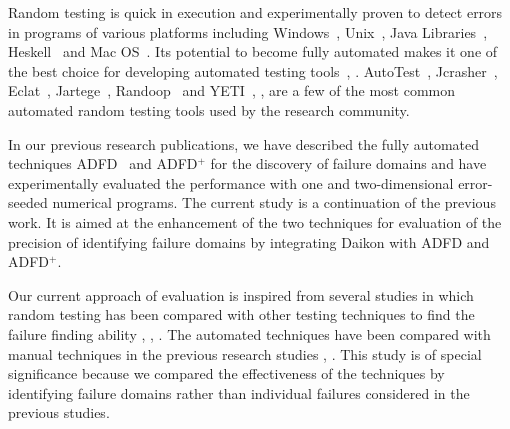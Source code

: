 \documentclass[runningheads,a4paper]{llncs}
\begin{document}
Random testing is quick in execution and experimentally proven to detect errors in programs of various platforms including Windows~\cite{forrester2000empirical}, Unix~\cite{miller1990empirical}, Java Libraries~\cite{pacheco2005eclat}, Heskell~\cite{claessen2011quickcheck} and Mac OS~\cite{miller2006empirical}.  Its potential to become fully automated makes it one of the best choice for developing automated testing tools~\cite{csallner2004jcrasher}, \cite{pacheco2005eclat}. AutoTest~\cite{ciupa2008predictability}, Jcrasher~\cite{csallner2004jcrasher}, Eclat~\cite{pacheco2005eclat}, Jartege~\cite{oriat2005jartege}, Randoop~\cite{pacheco2007randoop} and YETI~\cite{oriol2012random}, \cite{ahmad2013adfd}, \cite{ahmad2014adfd2} are a few of the most common automated random testing tools used by the research community. 

In our previous research publications, we have described the fully automated techniques ADFD~\cite{ahmad2013adfd} and ADFD$^+$ \cite{ahmad2014adfd2} for the discovery of failure domains and have experimentally evaluated the performance with one and two-dimensional error-seeded numerical programs. The current study is a continuation of the previous work. It is aimed at the enhancement of the two techniques for evaluation of the precision of identifying failure domains by integrating Daikon with ADFD and ADFD$^+$. 

Our current approach of evaluation is inspired from several studies in which random testing has been compared with other testing techniques to find the failure finding ability \cite{hamlet1990partition}, \cite{weyuker1991analyzing}, \cite{gutjahr1999partition}. The automated techniques have been compared with manual techniques in the previous research studies \cite{leitner2007reconciling}, \cite{ciupa2008finding}. This study is of special significance because we compared the effectiveness of the techniques by identifying failure domains rather than individual failures considered in the previous studies.

\end{document}
